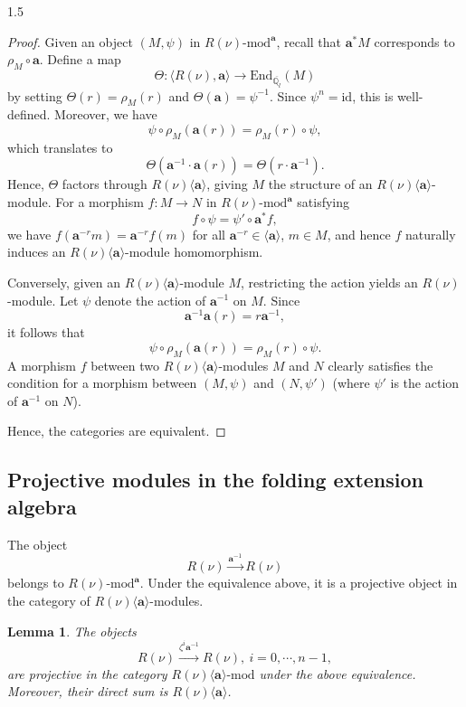 \documentclass[10pt]{amsart}
\newtheorem{lemma}[theorem]{Lemma}
\newcommand\bbq{{\mathbb Q}}
\begin{document}
\begin{spacing}{1.5}
\begin{proof}
Given an object $(M,\psi)$ in $R(\nu)\text{-}\mathrm{mod}^\mathbf{a}$, recall that $\mathbf{a}^*M$ corresponds to $\rho_M \circ \mathbf{a}$. Define a map
\[
\Theta : \langle R(\nu), \mathbf{a} \rangle \to \mathrm{End}_{\overline{\bbq_l}}(M)
\]
by setting $\Theta(r) = \rho_M(r)$ and $\Theta(\mathbf{a}) = \psi^{-1}$. Since $\psi^n = \mathrm{id}$, this is well-defined. Moreover, we have
\[
\psi \circ \rho_M(\mathbf{a}(r)) = \rho_M(r) \circ \psi,
\]
which translates to
\[
\Theta(\mathbf{a}^{-1} \cdot \mathbf{a}(r)) = \Theta(r \cdot \mathbf{a}^{-1}).
\]
Hence, $\Theta$ factors through $R(\nu)\langle\mathbf{a}\rangle$, giving $M$ the structure of an $R(\nu)\langle\mathbf{a}\rangle$-module. For a morphism $f : M \to N$ in $R(\nu)\text{-}\mathrm{mod}^\mathbf{a}$ satisfying
\[
f \circ \psi = \psi' \circ \mathbf{a}^* f,
\]
we have $f(\mathbf{a}^{-r} m) = \mathbf{a}^{-r} f(m)$ for all $\mathbf{a}^{-r} \in \langle\mathbf{a} \rangle$, $m \in M$, and hence $f$ naturally induces an $R(\nu)\langle\mathbf{a}\rangle$-module homomorphism.

Conversely, given an $R(\nu)\langle\mathbf{a}\rangle$-module $M$, restricting the action yields an $R(\nu)$-module. Let $\psi$ denote the action of $\mathbf{a}^{-1}$ on $M$. Since
\[
\mathbf{a}^{-1} \mathbf{a}(r) = r \mathbf{a}^{-1},
\]
it follows that
\[
\psi \circ \rho_M(\mathbf{a}(r)) = \rho_M(r) \circ \psi.
\]
A morphism $f$ between two $R(\nu)\langle\mathbf{a}\rangle$-modules $M$ and $N$ clearly satisfies the condition for a morphism between $(M,\psi)$ and $(N,\psi')$ (where $\psi'$ is the action of $\mathbf{a}^{-1}$ on $N$).

Hence, the categories are equivalent.
\end{proof}
\subsection{Projective modules in the folding extension algebra}
The object
\[
R(\nu) \xrightarrow{\mathbf{a}^{-1}} R(\nu)
\]
belongs to $R(\nu)\text{-}\mathrm{mod}^\mathbf{a}$. Under the equivalence above, it is a projective object in the category of $R(\nu)\langle\mathbf{a}\rangle$-modules.

\begin{lemma}\label{pro}
The objects
\[
R(\nu) \xrightarrow{\zeta^i\mathbf{a}^{-1}} R(\nu),\ i=0,\cdots,n-1,
\]
are projective in the category $R(\nu)\langle\mathbf{a}\rangle\text{-}\mathrm{mod}$ under the above equivalence. Moreover, their direct sum is $R(\nu)\langle\mathbf{a}\rangle$.
\end{lemma}


\end{spacing}
\end{document}
